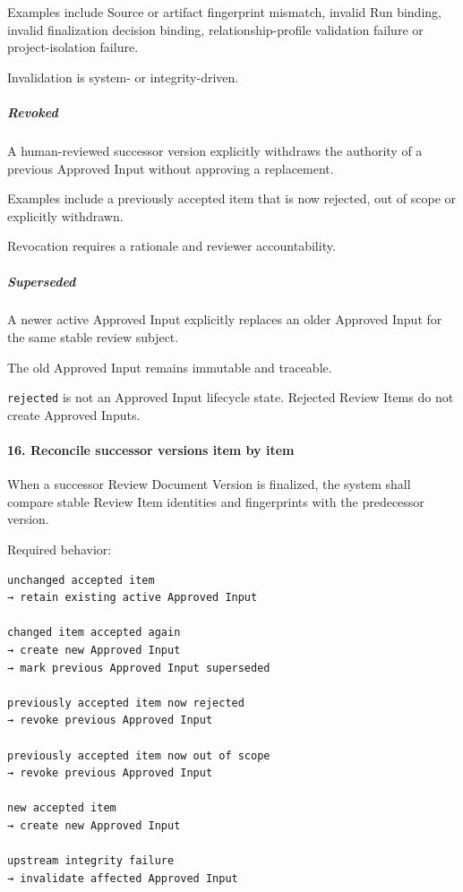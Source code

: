 Examples include Source or artifact fingerprint mismatch, invalid Run binding, invalid finalization decision binding, relationship-profile validation failure or project-isolation failure.

Invalidation is system- or integrity-driven.

\hypertarget{revoked}{%
\subparagraph{Revoked}\label{revoked}}

A human-reviewed successor version explicitly withdraws the authority of a previous Approved Input without approving a replacement.

Examples include a previously accepted item that is now rejected, out of scope or explicitly withdrawn.

Revocation requires a rationale and reviewer accountability.

\hypertarget{superseded}{%
\subparagraph{Superseded}\label{superseded}}

A newer active Approved Input explicitly replaces an older Approved Input for the same stable review subject.

The old Approved Input remains immutable and traceable.

\texttt{rejected} is not an Approved Input lifecycle state. Rejected Review Items do not create Approved Inputs.

\hypertarget{16-reconcile-successor-versions-item-by-item}{%
\paragraph{16. Reconcile successor versions item by item}\label{16-reconcile-successor-versions-item-by-item}}

When a successor Review Document Version is finalized, the system shall compare stable Review Item identities and fingerprints with the predecessor version.

Required behavior:

\begin{verbatim}
unchanged accepted item
→ retain existing active Approved Input

changed item accepted again
→ create new Approved Input
→ mark previous Approved Input superseded

previously accepted item now rejected
→ revoke previous Approved Input

previously accepted item now out of scope
→ revoke previous Approved Input

new accepted item
→ create new Approved Input

upstream integrity failure
→ invalidate affected Approved Input
\end{verbatim}

